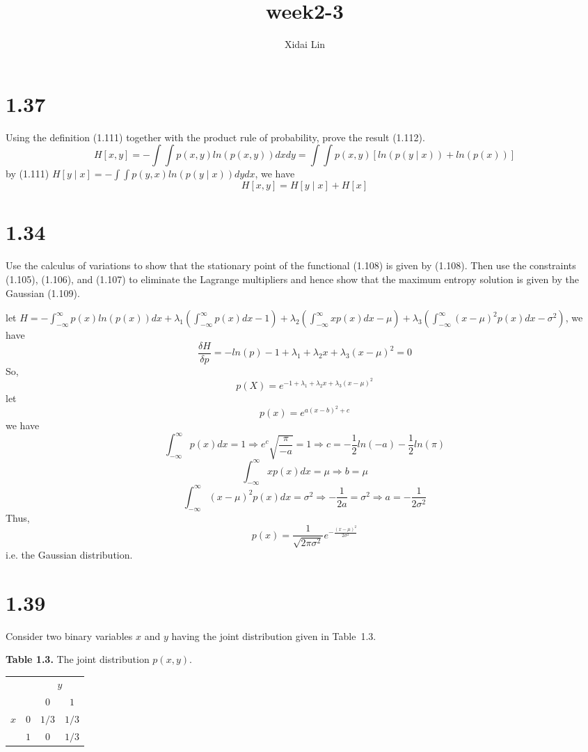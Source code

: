 \documentclass[a4paper, 11pt]{article}
\title{week2-3}
\author{Xidai Lin}
\date{}
\begin{document}
\maketitle
\section*{1.37}
Using the definition (1.111) together with the product rule of probability,
prove the result (1.112).
\[
H[x,y]=-\int\int p(x,y)ln(p(x,y))dxdy=\int\int p(x,y)[ln(p(y\mid x))+ln(p(x))]
\]
by (1.111) $H[y\mid x]=-\int\int p(y,x)ln(p(y\mid x))dydx$, we have
\[
H[x,y]=H[y\mid x]+H[x]
\]
\section*{1.34}
Use the calculus of variations to show that the stationary point of the
functional (1.108) is given by (1.108). Then use the constraints (1.105),
(1.106), and (1.107) to eliminate the Lagrange multipliers and hence show
that the maximum entropy solution is given by the Gaussian (1.109).

let $H=-\int_{-\infty}^{\infty}p(x)ln(p(x))dx+\lambda_1(\int_{-\infty}^{\infty}p(x)dx-1)+\lambda_2(\int_{-\infty}^{\infty}xp(x)dx-\mu)+\lambda_3(\int_{-\infty}^{\infty}(x-\mu)^2p(x)dx-\sigma^2)$, we have
\[
\frac{\delta H}{\delta p}=-ln(p)-1+\lambda_1+\lambda_2x+\lambda_3(x-\mu)^2=0
\]
So,\[
p(X)=e^{-1+\lambda_1+\lambda_2x+\lambda_3(x-\mu)^2}
\]
let
\[
p(x)=e^{a(x-b)^2+c}
\]
we have
\[
\int_{-\infty}^{\infty}p(x)dx=1\Rightarrow e^c\sqrt{\frac{\pi}{-a}}=1\Rightarrow c=-\frac{1}{2}ln(-a)-\frac{1}{2}ln(\pi)
\]
\[
\int_{-\infty}^{\infty}xp(x)dx=\mu\Rightarrow b=\mu   
\]
\[
\int_{-\infty}^{\infty}(x-\mu)^2p(x)dx=\sigma^2\Rightarrow -\frac{1}{2a}=\sigma^2\Rightarrow a=-\frac{1}{2\sigma^2}
\]
Thus,
\[
p(x)=\frac{1}{\sqrt{2\pi\sigma^2}}e^{-\frac{(x-\mu)^2}{2\sigma^2}}
\]
i.e. the Gaussian distribution.
\section*{1.39}
Consider two binary variables $x$ and $y$ having the joint distribution given
in Table~1.3.

\begin{center}
\textbf{Table 1.3.} The joint distribution $p(x,y)$.

\medskip
\begin{tabular}{crcc}
\toprule
& & \multicolumn{2}{c}{$y$} \\
\cmidrule(lr){3-4}
& & $0$ & $1$ \\
\midrule
$x$ & $0$ & $1/3$ & $1/3$ \\
    & $1$ & $0$   & $1/3$ \\
\bottomrule
\end{tabular}
\end{center}
\end{document}
